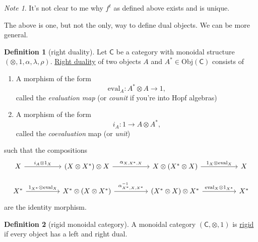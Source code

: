 \documentclass[a4paper,10pt]{scrreprt}
\newcommand{\defn}[1]{\ul{#1}}
\newcommand{\Obj}{\mathrm{Obj}}
\newcommand{\ev}{\mathrm{eval}}
\theoremstyle{definition}
\newtheorem{definition}{Definition}[section]
\theoremstyle{plain}
\theoremstyle{remark}
\newtheorem{note}{Note}[section]
\begin{document}
\begin{note}
  It's not clear to me why $f^{t}$ as defined above exists and is unique.
\end{note}

The above is one, but not the only, way to define dual objects. We can be more general.
\begin{definition}[right duality]
  \label{def:rightduality}
  Let $\mathsf{C}$ be a category with monoidal structure $(\otimes, 1, \alpha, \lambda, \rho)$. \defn{Right duality} of two objects $A$ and $A^{*} \in \Obj(\mathsf{C})$ consists of
  \begin{enumerate}
    \item A morphism of the form
      \begin{equation*}
        \ev_{A}\colon A^{*} \otimes A \to 1,
      \end{equation*}
      called the \emph{evaluation map} (or \emph{counit} if you're into Hopf algebras)

    \item A morphism of the form
      \begin{equation*}
        i_{A}\colon 1 \to A \otimes A^{*},
      \end{equation*}
      called the \emph{coevaluation} map (or \emph{unit})
  \end{enumerate}
  such that the compositions
  \begin{equation*}
    \begin{tikzcd}[column sep=huge]
      X 
      \arrow[r, "i_{A} \otimes 1_{X}"]
      & (X \otimes X^{*}) \otimes X
      \arrow[r, "{\alpha_{X, X^{*}, X}}"]
      & X \otimes (X^{*} \otimes X) 
      \arrow[r, "{1_{X} \otimes \ev_{X}}"]
      & X
      \\
      X^{*}
      \arrow[r, "{1_{X^{*}} \otimes \ev_{X}}"]
      & X^{*} \otimes (X \otimes X^{*})
      \arrow[r, "{\alpha^{-1}_{X^{*}, X, X^{*}}}"]
      & (X^{*} \otimes X) \otimes X^{*}
      \arrow[r, "{\ev_{X}\otimes 1_{X^{*}}}"]
      & X^{*}
    \end{tikzcd}
  \end{equation*}
  are the identity morphism.
\end{definition}

\begin{definition}[rigid monoidal category]
  \label{def:rigidmonoidalcategory}
  A monoidal category $(\mathsf{C}, \otimes, 1)$ is \defn{rigid} if every object has a left and right dual.
\end{definition}
\end{document}
